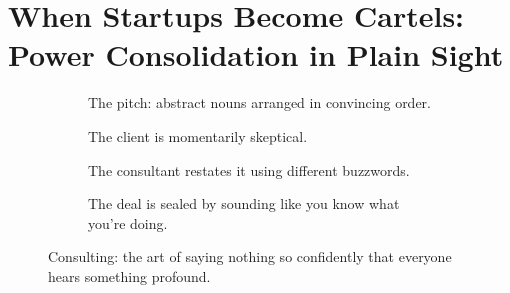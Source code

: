\section{When Startups Become Cartels: Power Consolidation in Plain Sight}

\vfill

\begin{figure}[H]
  \centering
  
  \begin{subfigure}[t]{0.45\textwidth}
  \centering
  \caption*{The pitch: abstract nouns arranged in convincing order.}
  \end{subfigure}
  \hfill
  \begin{subfigure}[t]{0.45\textwidth}
  \centering
  \caption*{The client is momentarily skeptical.}
  \end{subfigure}
  
  \vspace{1em}
  
  \begin{subfigure}[t]{0.45\textwidth}
  \centering
  \caption*{The consultant restates it using different buzzwords.}
  \end{subfigure}
  \hfill
  \begin{subfigure}[t]{0.45\textwidth}
  \centering
  \caption*{The deal is sealed by sounding like you know what you’re doing.}
  \end{subfigure}
  
  \caption*{Consulting: the art of saying nothing so confidently that everyone hears something profound.}
  \end{figure}



